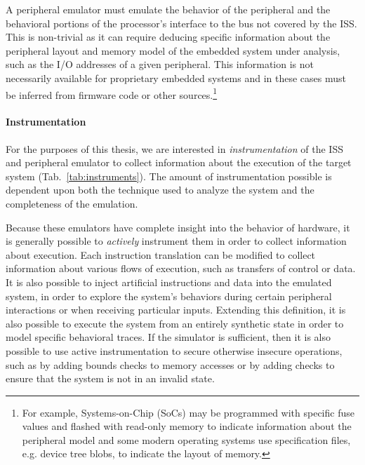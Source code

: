 A peripheral emulator must emulate the behavior of the peripheral and the behavioral portions of the processor's interface to the bus not covered by the ISS.
This is non-trivial as it can require deducing specific information about the peripheral layout and memory model of the embedded system under analysis, such as the I/O addresses of a given peripheral.
This information is not necessarily available for proprietary embedded systems and in these cases must be inferred from firmware code or other sources.\footnote{For example, Systems-on-Chip (SoCs) may be programmed with specific fuse values and flashed with read-only memory to indicate information about the peripheral model and some modern operating systems use specification files, e.g. device tree blobs, to indicate the layout of memory.}

\paragraph{Instrumentation}

For the purposes of this thesis, we are interested in \emph{instrumentation} of the ISS and peripheral emulator to collect information about the execution of the target system (Tab.~\ref{tab:instruments}).
The amount of instrumentation possible is dependent upon both the technique used to analyze the system and the completeness of the emulation.

Because these emulators have complete insight into the behavior of hardware, it is generally possible to \emph{actively} instrument them in order to collect information about execution.
Each instruction translation can be modified to collect information about various flows of execution, such as transfers of control or data.
It is also possible to inject artificial instructions and data into the emulated system, in order to explore the system's behaviors during certain peripheral interactions or when receiving particular inputs.
Extending this definition, it is also possible to execute the system from an entirely synthetic state in order to model specific behavioral traces.
If the simulator is sufficient, then it is also possible to use active instrumentation to secure otherwise insecure operations, such as by adding bounds checks to memory accesses or by adding checks to ensure that the system is not in an invalid state.

